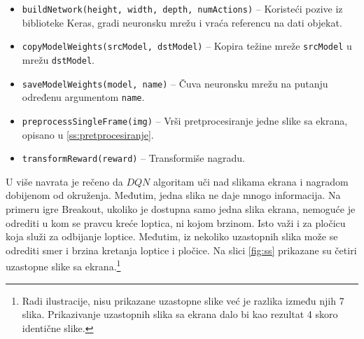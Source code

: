 \begin{itemize}
	\item \texttt{buildNetwork(height, width, depth, numActions)} -- Koristeći pozive iz biblioteke Keras, gradi neuronsku mrežu i vraća referencu na dati objekat.
	\item \texttt{copyModelWeights(srcModel, dstModel)} -- Kopira težine mreže \texttt{srcModel} u mrežu \texttt{dstModel}.
	\item \texttt{saveModelWeights(model, name)} -- Čuva neuronsku mrežu na putanju određenu argumentom \texttt{name}.
	\item \texttt{preprocessSingleFrame(img)} -- Vrši pretprocesiranje jedne slike sa ekrana, opisano u \ref{ss:pretprocesiranje}.
	\item \texttt{transformReward(reward)} -- Transformiše nagradu.
\end{itemize}
\par 
U više navrata je rečeno da $DQN$ algoritam uči nad slikama ekrana i nagradom dobijenom od okruženja. Međutim, jedna slika ne daje mnogo informacija. Na primeru igre Breakout, ukoliko je dostupna samo jedna slika ekrana, nemoguće je odrediti u kom se pravcu kreće loptica, ni kojom brzinom. Isto važi i za pločicu koja služi za odbijanje loptice. Međutim, iz nekoliko uzastopnih slika može se odrediti smer i brzina kretanja loptice i pločice. Na slici \ref{fig:ss} prikazane su četiri uzastopne slike sa ekrana.\footnote{Radi ilustracije, nisu prikazane uzastopne slike već je razlika između njih 7 slika. Prikazivanje uzastopnih slika sa ekrana dalo bi kao rezultat 4 skoro identične slike.} 

